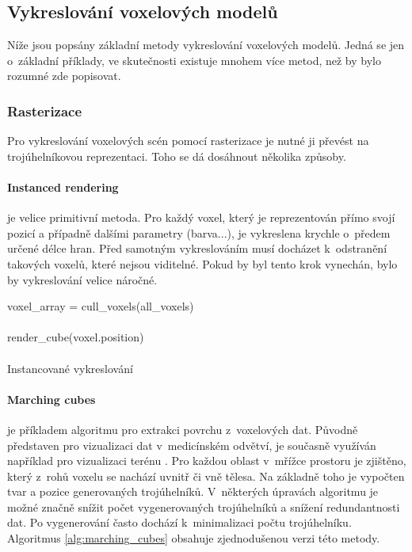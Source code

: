 \subsection{Vykreslování voxelových modelů}\label{sec:voxel_render}
Níže jsou popsány základní metody vykreslování voxelových modelů. Jedná se jen o~základní příklady, ve skutečnosti existuje mnohem více metod, než by bylo rozumné zde popisovat.

\subsubsection{Rasterizace}
Pro vykreslování voxelových scén pomocí rasterizace je nutné ji převést na trojúhelníkovou reprezentaci. Toho se dá dosáhnout několika způsoby.

\paragraph{Instanced rendering} je velice primitivní metoda. Pro každý voxel, který je reprezentován přímo svojí pozicí a případně dalšími parametry (barva...), je vykreslena krychle o~předem určené délce hran. Před samotným vykreslováním musí docházet k~odstranění takových voxelů, které nejsou viditelné. Pokud by byl tento krok vynechán, bylo by vykreslování velice náročné. \cite{nousiainen_2019}

\begin{center}
	\begin{czechalgorithm}[H] \label{alg:instanced_cube}
		voxel\_array = cull\_voxels(all\_voxels)\\
		 {\\
			render\_cube(voxel.position)\\
		}\\
		\caption{Instancované vykreslování}
	\end{czechalgorithm}
\end{center}

\paragraph{Marching cubes \cite{marching_cubes}} je příkladem algoritmu pro extrakci povrchu z~voxelových dat. Původně představen pro vizualizaci dat v~medicínském odvětví, je současně využíván například pro vizualizaci terénu \cite{nguyen_2008}. Pro každou oblast v~mřížce prostoru je zjištěno, který z~rohů voxelu se nachází uvnitř či vně tělesa. Na základně toho je vypočten tvar a pozice generovaných trojúhelníků. V~některých úpravách algoritmu je možné značně snížit počet vygenerovaných trojúhelníků a snížení redundantnosti dat. Po vygenerování často dochází k~minimalizaci počtu trojúhelníku. Algoritmus \ref{alg:marching_cubes} obsahuje zjednodušenou verzi této metody.


